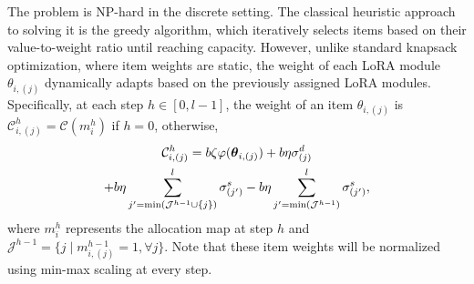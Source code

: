 \documentclass[sigconf]{acmart}
\begin{document}
The problem is NP-hard in the discrete setting. The classical heuristic approach to solving it is the greedy algorithm, which iteratively selects items based on their value-to-weight ratio until reaching capacity. However, unlike standard knapsack optimization, where item weights are static, the weight of each LoRA module $\boldsymbol{\mathcal{\theta}}_{i, (j)}$ dynamically adapts based on the previously assigned LoRA modules. Specifically, at each step $h\in[0, l-1]$, the weight of an item $\boldsymbol{\mathcal{\theta}}_{i, (j)}$ is $\mathcal{C}_{i,(j)}^{h} = \mathcal{C}(m_i^h)$ if $h=0$, otherwise, 
\begin{multline}\label{eq:weightfunction}
\mathcal{C}_{i,(j)}^{h} = b\zeta\varphi(\boldsymbol{\mathcal{\theta}}_{i, (j)}) + b\eta\sigma_{(j)}^{d} \notag  \\
 + b\eta\sum_{j^{\prime}=\min(\mathcal{J}^{h-1} \cup \{ j \})}^{l} \sigma_{(j^\prime)}^{s} - b\eta\sum_{j^{\prime}=\min(\mathcal{J}^{h-1})}^{l} \sigma_{(j^\prime)}^{s},
\end{multline}
where $m_{i}^{h}$ represents the allocation map at step $h$ and $\mathcal{J}^{h-1} = \{ j \mid m_{i,(j)}^{h-1} = 1, \forall j \}$. Note that these item weights will be normalized using min-max scaling at every step.

\end{document}
